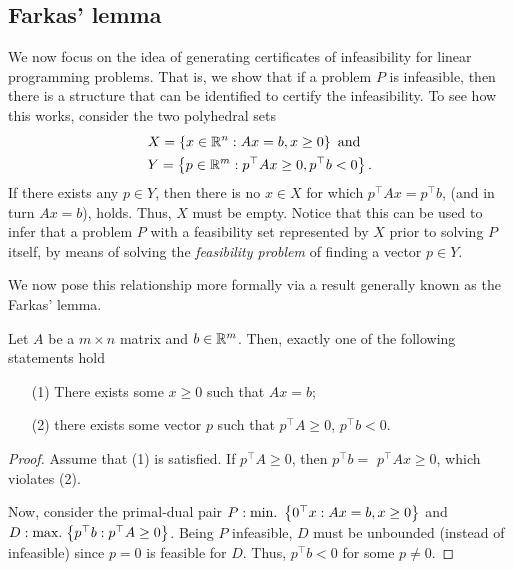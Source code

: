  

\subsection{Farkas' lemma}

We now focus on the idea of generating certificates of infeasibility for linear programming problems. That is, we show that if a problem $P$ is infeasible, then there is a structure that can be identified to certify the infeasibility. To see how this works, consider the two polyhedral sets
%
\begin{align*}
	&X = \left\{ x \in \mathbb{R}^n : Ax = b,  x \geq 0 \right \} \text{ and } \\ 
	&Y = \left\{ p \in \mathbb{R}^m : p^\top A x \geq 0, p^\top b < 0 \right \}.
\end{align*}
%
If there exists any $p \in Y$, then there is no $x \in X$ for which $p^\top Ax = p^\top b$, (and in turn $Ax = b$), holds. Thus, $X$ must be empty. Notice that this can be used to infer that a problem $P$ with a feasibility set represented by $X$ prior to solving $P$ itself, by means of solving the \emph{feasibility problem} of finding a vector $p \in Y$. 

We now pose this relationship more formally via a result generally known as the Farkas' lemma.

\begin{theorem} \label{p1c6:thm:farkas}
	Let $A$ be a $m \times n$ matrix and $b \in \mathbb{R}^m$. Then, exactly one of the following statements hold
	\begin{enumerate}
		\item[(1)] There exists some $x \geq 0$ such that $Ax = b$;
		\item[(2)] there exists some vector $p$ such that $p^\top A \geq 0$, $p^\top b < 0$. 
	\end{enumerate}
\end{theorem}

\begin{proof}
	Assume that (1) is satisfied. If $p^\top A \geq 0$, then $p^\top b =$ $p^\top Ax \geq 0$, which violates (2).
	
	Now, consider the primal-dual pair $P : \mathop{\text{min.~}}\left\{ 0^\top x : Ax = b, x \geq 0 \right \}$ and $D : \mathop{\text{max.~}}\hspace{-2pt}\left\{ p^\top b : p^\top A \geq 0 \right \}$. Being $P$ infeasible, $D$ must be unbounded (instead of infeasible) since $p = 0$ is feasible for $D$. Thus, $p^\top b < 0$ for some $p \neq 0$. 	
\end{proof}

